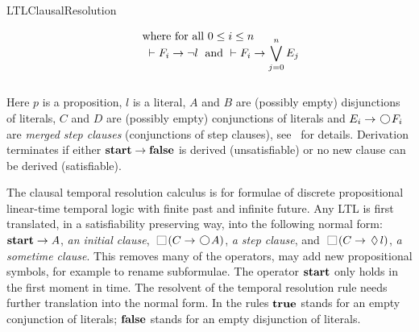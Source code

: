 \begin{entry}{LTLClausalResolution}
\begin{calculus}
\[\begin{array}{c}
\begin{array}[b]{ll}
& \quad
\begin{array}{l}
\text{where for all } 0 \leq i \leq n \\[-5pt]
\mbox{}\;\vdash F_i \rightarrow \neg l \; \text{ and }
\vdash F_i \rightarrow \displaystyle \bigvee_{j=0}^n E_j
\vspace*{0.9em}
\end{array}
\end{array}
\end{array}
\]

\vspace*{-1em}
Here $p$ is a proposition, $l$ is a literal, $A$ and $B$ are (possibly empty) disjunctions of literals,
$C$ and $D$ are (possibly empty) conjunctions of literals and $E_i\rightarrow\Next F_i$  are \emph{merged step clauses}
(conjunctions of step clauses), see~\cite{FDP01} for details.
Derivation terminates if either ${\bf start}\rightarrow{\bf false}$ is derived (unsatisfiable) or no new clause can be derived (satisfiable).  
\end{calculus}


 \begin{clarifications}
The clausal temporal resolution calculus is for formulae of discrete propositional
linear-time temporal logic with finite past and infinite future.
Any LTL is first translated, in a satisfiability preserving way, into the
following  normal form: 
${\bf start} \rightarrow A$, {\em an initial clause},
$ \Always (C \rightarrow  \Next A)$, {\em a step clause}, and
$\Always  (C   \rightarrow  \sometime l)$, {\em a sometime clause}.
%
This removes many of the operators, may add new propositional 
symbols, for example to rename subformulae.
%
The operator ${\bf start}$ only holds in the first moment in time. 
%
The resolvent of the temporal resolution rule needs further translation into
the normal form. 
%
In the rules ${\bf true}$ stands for an empty conjunction of literals; ${\bf false}$
stands for an empty disjunction of literals.
 \end{clarifications}


\end{entry}
